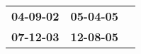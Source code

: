 \begin{supertabular}{p{0.33\columnwidth}p{0.33\columnwidth}p{0.33\columnwidth}}
 \textbf{04-09-02\textsuperscript{}} &  \textbf{05-04-05\textsuperscript{}} \\
 \textbf{07-12-03\textsuperscript{}} &  \textbf{12-08-05\textsuperscript{}} \\
\end{supertabular}

